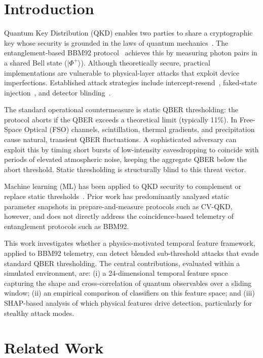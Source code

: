 \documentclass[conference]{IEEEtran}
\begin{document}
\section{Introduction}

Quantum Key Distribution (QKD) enables two parties to share a cryptographic key whose security is grounded in the laws of quantum mechanics~\cite{bennett1984quantum}. The entanglement-based BBM92 protocol~\cite{bennett1992quantum} achieves this by measuring photon pairs in a shared Bell state ($|\Phi^+\rangle$). Although theoretically secure, practical implementations are vulnerable to physical-layer attacks that exploit device imperfections. Established attack strategies include intercept-resend~\cite{fuchs1997optimal}, faked-state injection~\cite{makarov2005faked}, and detector blinding~\cite{lydersen2010hacking}.

The standard operational countermeasure is static QBER thresholding: the protocol aborts if the QBER exceeds a theoretical limit (typically 11\%). In Free-Space Optical (FSO) channels, scintillation, thermal gradients, and precipitation cause natural, transient QBER fluctuations. A sophisticated adversary can exploit this by timing short bursts of low-intensity eavesdropping to coincide with periods of elevated atmospheric noise, keeping the aggregate QBER below the abort threshold. Static thresholding is structurally blind to this threat vector.

Machine learning (ML) has been applied to QKD security to complement or replace static thresholds~\cite{mao2020detecting,liu2025deep}. Prior work has predominantly analyzed static parameter snapshots in prepare-and-measure protocols such as CV-QKD, however, and does not directly address the coincidence-based telemetry of entanglement protocols such as BBM92.

This work investigates whether a physics-motivated temporal feature framework, applied to BBM92 telemetry, can detect blended sub-threshold attacks that evade standard QBER thresholding. The central contributions, evaluated within a simulated environment, are: (i) a 24-dimensional temporal feature space capturing the shape and cross-correlation of quantum observables over a sliding window; (ii) an empirical comparison of classifiers on this feature space; and (iii) SHAP-based analysis of which physical features drive detection, particularly for stealthy attack modes.

\section{Related Work}
\end{document}
